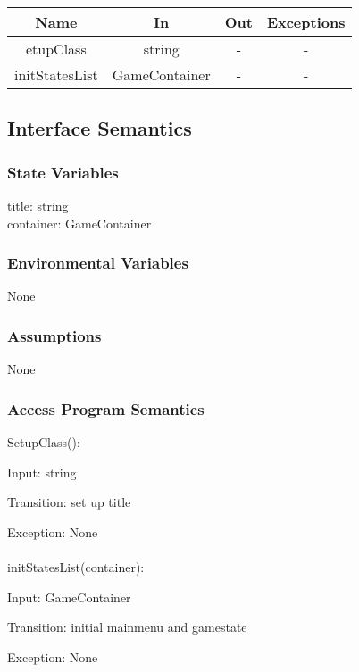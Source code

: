 \documentclass[12,english]{article}
\begin{document}
	\begin{tabular}[pos]{|c|c|c|c|}
	\hline
	\textbf{Name}& \textbf{In} & \textbf{Out} & \textbf{Exceptions} \\ 
	\hline
	etupClass & string & - & - \\ \hline
	initStatesList & GameContainer& - & - \\ \hline

					
	\end{tabular}		
		
	\subsection{Interface Semantics}
		\subsubsection{State Variables}
		title: string\\
		container: GameContainer\\ 
	    
		\subsubsection{Environmental Variables}
		None
		\subsubsection{Assumptions}
        None

		\subsubsection{Access Program Semantics}
		SetupClass():
		
		Input: string
		
		Transition: set up title 
		
		Exception: None\\
		\\
		initStatesList(container):
		
		Input: GameContainer
		
		Transition: initial mainmenu and gamestate
		
		Exception: None\\
		\\	
		
\end{document}
